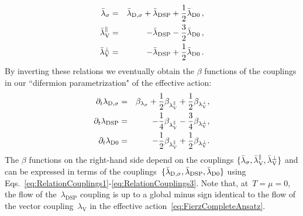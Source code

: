 \documentclass[prd,english,preprintnumbers,amsmath,amssymb,nofootinbib,twocolumn,superscriptaddress]{revtex4-1}
\newcommand{\be}{\begin{eqnarray}}
\newcommand{\ee}{\end{eqnarray}}
\newcommand{\del}{\partial}
\begin{document}
{{{%
\be
\bar \lambda_\sigma &=&  \bar \lambda_{\text{D},\sigma} +  \bar \lambda_\text{DSP} + \frac 1 2 \bar \lambda_\text{D0}\,,  
\label{eq:RelationCouplings1}\\
%
%
\bar \lambda_\text V ^\parallel &=&  - \bar \lambda_\text{DSP} -\frac 3 2 \bar \lambda _\text{D0}\,,
\label{eq:RelationCouplings2}\\
%
%
\bar \lambda_\text V ^\perp &=& - \bar \lambda _\text{DSP} + \frac 1 2 \bar \lambda_\text{D0}\,.
 \label{eq:RelationCouplings3}
\ee
%
By} inverting these relations we eventually obtain the $\beta$ functions of the couplings in our 
``difermion parametrization" of the effective {action:
%
\be
\del_t  \lambda_{\text{D},\sigma} &=& \beta _{\lambda_\sigma} +\frac 1 2  \beta_{\lambda_\text V ^\parallel} +\frac 1 2  \beta_{\lambda_\text V ^\perp}, \\
\del_t  \lambda_\text{DSP} &=& - \frac 1 4 \beta_{\lambda_\text V ^\parallel} - \frac 3 4 \beta _{\lambda_\text V ^\perp}, \\
\del_t  \lambda_\text{D0} &=& - \frac 1 2 \beta_{\lambda_\text V ^\parallel} + \frac 1 2 \beta_{\lambda _\text V^\perp}.
\label{eq:dffloweq}
\ee
%
The} $\beta$ functions on the right-hand side depend on the couplings $\{ \bar \lambda_\sigma, \bar \lambda_\text V ^ \parallel, \bar \lambda_\text V ^\perp \}$
and can be expressed in terms of the 
couplings~$\{  \bar \lambda_{{\rm D},\sigma}, \bar \lambda _\text{DSP}, \bar \lambda_\text{D0}\}$ 
using Eqs.~\eqref{eq:RelationCouplings1}-\eqref{eq:RelationCouplings3}.
Note that, at~$T=\mu=0$, the flow of the~$\lambda_\text{DSP}$ coupling is {up to a global minus sign 
identical to the flow of the vector coupling~${\lambda}_{\text{V}}$ in the effective action~\eqref{eq:FierzCompleteAnsatz}.}

}}
\end{document}
